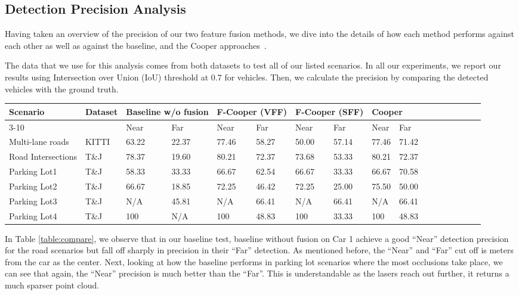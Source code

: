 \documentclass[sigconf]{acmart}
\begin{document}
\subsection{\textbf{Detection Precision Analysis}}

Having taken an overview of the precision of our two feature fusion methods, we dive into the details of how each method performs against each other as well as against the baseline, and the Cooper approaches~\cite{qi2019cooper}. 

The data that we use for this analysis comes from both datasets to test all of our listed scenarios. 
In all our experiments, we report our results using Intersection over Union (IoU) threshold at 0.7 for vehicles. Then, we calculate the precision by comparing the detected vehicles with the ground truth.


{
\color{red}
\begin{table*}[!thbp]
\centering
\begin{tabular}{|p{25mm}|p{10mm}|p{5mm}|p{5mm}|p{5mm}|p{5mm}|p{5mm}|p{5mm}|p{5mm}|p{5mm}|p{5mm}|p{5mm}|p{5mm}|p{5mm}|p{5mm}|p{5mm}|p{8mm}|}
\hline
Scenario&Dataset&\multicolumn{2}{l|}{Baseline w/o fusion}&\multicolumn{2}{l|}{F-Cooper (VFF)}&\multicolumn{2}{l|}{F-Cooper (SFF)}&\multicolumn{2}{l|}{Cooper \cite{qi2019cooper}}\\
\cline{3-10}
&&Near&Far&Near&Far&Near&Far&Near&Far\\
\hline
Multi-lane roads&KITTI&63.22&22.37&77.46&58.27&50.00&57.14&77.46&71.42\\
\hline
Road Intersections&T\&J &78.37&19.60&80.21&72.37&73.68&53.33&80.21&72.37\\
 \hline
Parking Lot1&T\&J&58.33&33.33&66.67&62.54&66.67&33.33&66.67&70.58\\
\hline
Parking Lot2&T\&J&66.67&18.85&72.25&46.42&72.25&25.00&75.50&50.00\\
\hline
Parking Lot3&T\&J&N/A&45.81&N/A&66.41&N/A&66.41&N/A&66.41\\
\hline
Parking Lot4&T\&J&100&N/A&100&48.83&100&33.33&100&48.83\\
\hline
\end{tabular}
\vspace{10pt}
\caption{Precision comparison between F-Copper and Cooper on Car 1: Average precision (in \%). "N/A" means no vehicle exits in the corresponding scenarios.}
\vspace{-10pt}
\label{table:compare}
\end{table*}
}


In Table \ref{table:compare}, we observe that in our baseline test, baseline without fusion on Car 1  achieve a good ``Near'' detection precision for the road scenarios but fall off sharply in precision in their ``Far'' detection. As mentioned before, the ``Near'' and ``Far'' cut off is  meters from the car as the center. Next, looking at how the baseline performs in parking lot scenarios where the most occlusions take place, we can see that again, the ``Near'' precision is much better than the ``Far''. This is understandable as the lasers reach out further, it returns a much sparser point cloud. 
\end{document}
